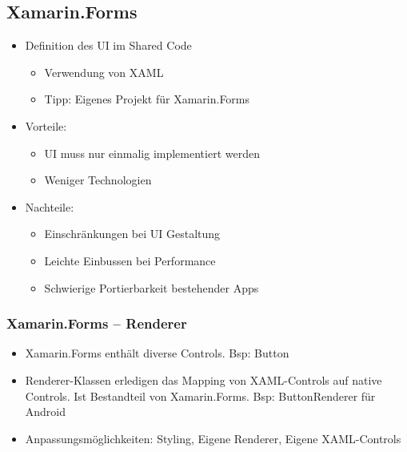 \subsection{Xamarin.Forms}
\begin{itemize}[topsep=0pt, leftmargin=4mm]
    \setlength\itemsep{-0.3em}
    \item Definition des UI im Shared Code
    \begin{itemize}[topsep=0pt, leftmargin=4mm]
        \setlength\itemsep{-0.3em}
        \item Verwendung von XAML
        \item Tipp: Eigenes Projekt für Xamarin.Forms
    \end{itemize}
    \item Vorteile:
    \begin{itemize}[topsep=0pt, leftmargin=4mm]
        \setlength\itemsep{-0.3em}
        \item UI muss nur einmalig implementiert werden
        \item Weniger Technologien
    \end{itemize}
    \item Nachteile:
    \begin{itemize}[topsep=0pt, leftmargin=4mm]
        \setlength\itemsep{-0.3em}
        \item Einschränkungen bei UI Gestaltung
        \item Leichte Einbussen bei Performance
        \item Schwierige Portierbarkeit bestehender Apps
    \end{itemize}
\end{itemize}
\subsubsection{Xamarin.Forms – Renderer}
\begin{itemize}[topsep=0pt, leftmargin=4mm]
    \setlength\itemsep{-0.3em}
    \item Xamarin.Forms enthält diverse Controls. Bsp: Button
    \item Renderer-Klassen erledigen das Mapping von XAML-Controls auf native Controls. Ist Bestandteil von Xamarin.Forms. Bsp: ButtonRenderer für Android
    \item Anpassungsmöglichkeiten: Styling, Eigene Renderer, Eigene XAML-Controls
\end{itemize}
